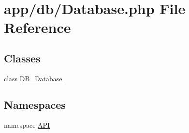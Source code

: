 \hypertarget{Database_8php}{
\section{app/db/Database.php File Reference}
\label{d2/d89/Database_8php}
}
\subsection*{Classes}
\begin{DoxyCompactItemize}
\item 
class \hyperlink{classDB__Database}{DB\_\-Database}
\end{DoxyCompactItemize}
\subsection*{Namespaces}
\begin{DoxyCompactItemize}
\item 
namespace \hyperlink{namespaceAPI}{API}
\end{DoxyCompactItemize}

